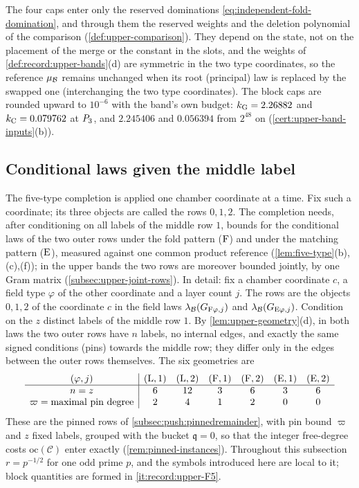 The four caps enter only the reserved dominations
\eqref{eq:independent-fold-domination}, and through them the reserved weights and
the deletion polynomial of the comparison (\cref{def:upper-comparison}). They depend
on the state, not on the placement of the merge or the constant in the slots, and
the weights of \cref{def:record:upper-bands}(d) are symmetric in the two type
coordinates, so the reference $\mu_\mathcal B$ remains unchanged
when its root (principal) law is replaced by the swapped one
(interchanging the two type coordinates). The block caps
are rounded upward to $10^{-6}$ with the band's own budget: $k_{\rm G}=2.26882$ and
$k_{\rm C}=0.079762$ at $P_3$, and $2.245406$ and $0.056394$ from $2^{48}$ on
(\cref{cert:upper-band-inputs}(b)).

\subsection{Conditional laws given the middle label}\label{subsec:upper-rows}

The five-type completion is applied one chamber coordinate at a
time. Fix such a coordinate; its three objects are called the
rows $0,1,2$. The completion needs, after conditioning on all
labels of the middle row $1$, bounds for the conditional laws of
the two outer rows under the fold pattern ($\rm F$) and under the
matching pattern ($\rm E$), measured against one common product
reference (\cref{lem:five-type}(b),(c),(f)); in the upper bands
the two rows are moreover bounded jointly, by one Gram matrix
(\cref{subsec:upper-joint-rows}). In detail: fix a chamber
coordinate $c$, a field type $\varphi$ of the other coordinate and
a layer count $j$. The rows are the objects $0,1,2$ of the
coordinate $c$ in the field laws
$\lambda_\mathcal B(G_{{\rm F}\varphi,j})$ and
$\lambda_\mathcal B(G_{{\rm E}\varphi,j})$. Condition on the $z$ distinct
labels of the middle row $1$. By \cref{lem:upper-geometry}(d), in
both laws the two outer rows have $n$ labels, no internal edges,
and exactly the same signed conditions (pins) towards the middle
row; they differ only in the edges between the outer rows
themselves. The six geometries are
\[
\begin{array}{c|cccccc}
 (\varphi,j)&({\rm L},1)&({\rm L},2)&({\rm F},1)&({\rm F},2)&({\rm E},1)&({\rm E},2)\\
 \hline
 n=z&6&12&3&6&3&6\\
 \varpi=\text{maximal pin degree}&2&4&1&2&0&0
\end{array}
\]
These are the pinned rows of \cref{subsec:push:pinnedremainder}, with pin bound
$\varpi$ and $z$ fixed labels, grouped with the bucket $\mathfrak q=0$, so that the
integer free-degree costs $\mathrm{oc}(\mathcal C)$ enter exactly
(\cref{rem:pinned-instances}). Throughout this subsection $r=p^{-1/2}$ for one odd
prime $p$, and the symbols introduced here are local to it; block quantities are
formed in \ref{it:record:upper-F5}.

